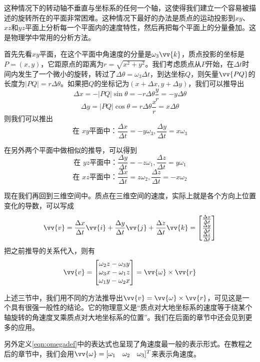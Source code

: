 \documentclass[11pt]{article}
\begin{document}
这种情况下的转动轴不垂直与坐标系的任何一个轴，这使得我们建立一个容易被描述的旋转所在的平面非常困难。这种情况下最好的办法是质点的运动投影到$xy$、$xz$和$yz$平面上分析每一个平面内的速度特性，然后再把每个平面上的分量叠加。这是物理学中常用的分析方法。

首先先看$xy$平面，在这个平面中角速度的分量是$\omega_3\vv{k}$，质点投影的坐标是$P=(x,y)$，它距原点的距离为$r = \sqrt{x^2+y^2}$。我们考虑质点从$P$开始，在$\Delta t$时间内发生了一个微小的旋转，转过了$\Delta\theta = \omega_3\Delta t$，到达坐标$Q$，则矢量$\vv{PQ}$的长度为$|PQ| = r\Delta\theta$。如果把$Q$的坐标记为$(x+\Delta x, y + \Delta y)$，我们可以推导出
$$
\Delta x = - |PQ|\sin\theta = - r\Delta\theta \frac{y}{r} = -y \Delta\theta
$$
$$
\Delta y =  |PQ|\cos\theta =  r\Delta\theta \frac{x}{r} = x \Delta\theta
$$
则我们可以推出
$$
\text{在 $xy$平面中：} \frac{\Delta x}{\Delta t} = -y \omega_3 ,  \frac{\Delta y}{\Delta t} = x \omega_3
$$

在另外两个平面中做相似的推导，可以得到
$$
\text{在 $yz$平面中：} \frac{\Delta y}{\Delta t} = -z \omega_1 ,  \frac{\Delta z}{\Delta t} = y \omega_1
$$
$$
\text{在 $xz$平面中：} \frac{\Delta x}{\Delta t} = z \omega_2 ,  \frac{\Delta z}{\Delta t} = -x \omega_2
$$

现在我们再回到三维空间中。质点在三维空间的速度，实际上就是各个方向上位置变化的导数，可以写成
$$
\vv{v} = \frac{\Delta x}{\Delta t} \vv{i} + \frac{\Delta y}{\Delta t} \vv{j} + \frac{\Delta z}{\Delta t} \vv{k} =
\begin{bmatrix}
\frac{\Delta x}{\Delta t} \\
\frac{\Delta y}{\Delta t} \\
\frac{\Delta z}{\Delta t} 
\end{bmatrix}
$$
把之前推导的关系代入，则有
$$
\vv{v} = \begin{bmatrix}
\omega_2z - \omega_3y \\
\omega_3x - \omega_1z \\
\omega_1y - \omega_2x 
\end{bmatrix}
= \vv{\omega} \times \vv{r}
$$

上述三节中，我们用不同的方法推导出$\vv{v} = \vv{\omega} \times \vv{r}$，可见这是一个具有很强一般性的结论。它的物理意义是“质点对大地坐标系的速度等于绕某个轴旋转的角速度叉乘质点对大地坐标系的位置”。我们在后面的章节中还会见到更多的应用。

另外定义\ref{eqn:omegadef}中的表达式也呈现了角速度最一般的表示形式。在教程之后的章节中，我们会用$\vv{\omega} = [\omega_1\ \ \  \omega_2\ \ \  \omega_3]^T$来表示角速度。
\end{document}
